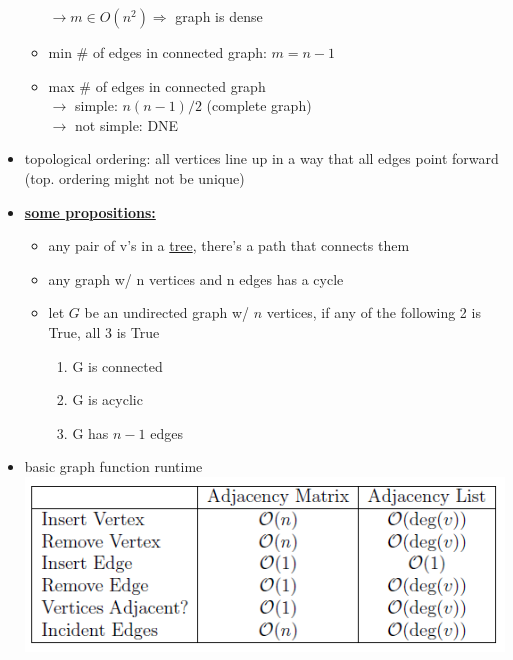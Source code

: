 \begin{itemize}
\begin{itemize}[leftmargin = 1em]
        $\longrightarrow m \in O(n^2) \Longrightarrow$ graph is dense 
        \item min \# of edges in connected graph: $m = n-1$
        \item max \# of edges in connected graph\\
        $\longrightarrow$ simple: $n(n-1)/2$ (complete graph)\\
        $\longrightarrow$ not simple: DNE
    \end{itemize} 
    \item topological ordering: all vertices line up in a way that all edges point forward (top. ordering might not be unique)
    \item \ul{\textbf{some propositions:}}
    \begin{itemize}[leftmargin = 1em]
        \item any pair of v's in a \ul{tree}, there's a path that connects them
        \item any graph w/ n vertices and n edges has a cycle
        \item let $G$ be an undirected graph w/ $n$ vertices, if any of the following 2 is True, all 3 is True
        \begin{enumerate}
            \item G is connected
            \item G is acyclic
            \item G has $n-1$ edges
        \end{enumerate}
    \end{itemize}
    \item basic graph function runtime\\
        \includegraphics[scale = 0.8]{pictures/runtime graph basic.png} 
\end{itemize}
